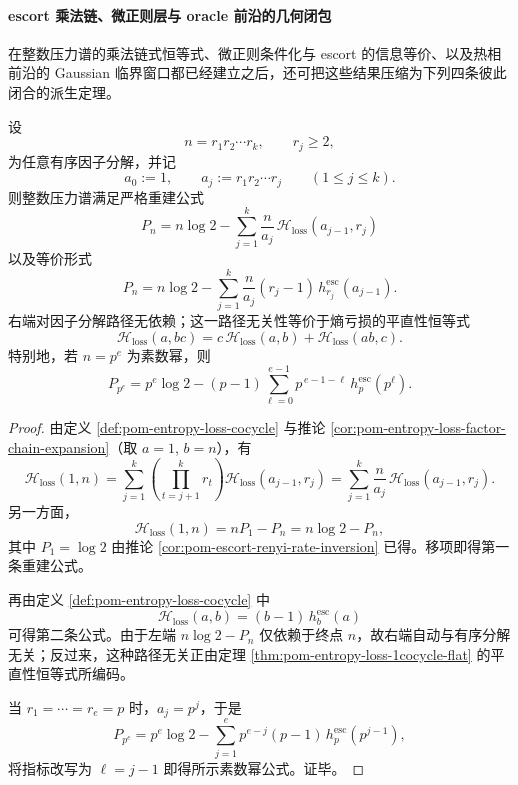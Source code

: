 \paragraph{escort 乘法链、微正则层与 oracle 前沿的几何闭包}
在整数压力谱的乘法链式恒等式、微正则条件化与 escort 的信息等价、以及热相前沿的 Gaussian 临界窗口都已经建立之后，还可把这些结果压缩为下列四条彼此闭合的派生定理。

\begin{theorem}[整数压力谱的素因子边缘全息重建]\label{thm:pom-pressure-prime-edge-holographic-reconstruction}
设
\[
n=r_1r_2\cdots r_k,\qquad r_j\ge 2,
\]
为任意有序因子分解，并记
\[
a_0:=1,\qquad a_j:=r_1r_2\cdots r_j\qquad(1\le j\le k).
\]
则整数压力谱满足严格重建公式
\[
\boxed{\;
P_n
=
n\log 2
-\sum_{j=1}^{k}\frac{n}{a_j}\,\mathcal{H}_{\mathrm{loss}}(a_{j-1},r_j)\;}
\]
以及等价形式
\[
\boxed{\;
P_n
=
n\log 2
-\sum_{j=1}^{k}\frac{n}{a_j}(r_j-1)\,h^{\mathrm{esc}}_{r_j}(a_{j-1}).\;}
\]
右端对因子分解路径无依赖；这一路径无关性等价于熵亏损的平直性恒等式
\[
\mathcal{H}_{\mathrm{loss}}(a,bc)
=
c\,\mathcal{H}_{\mathrm{loss}}(a,b)+\mathcal{H}_{\mathrm{loss}}(ab,c).
\]
特别地，若 \(n=p^e\) 为素数幂，则
\[
\boxed{\;
P_{p^e}
=
p^e\log 2
-(p-1)\sum_{\ell=0}^{e-1}p^{\,e-1-\ell}\,h^{\mathrm{esc}}_{p}(p^\ell).\;}
\]
\end{theorem}
\begin{proof}
由定义 \ref{def:pom-entropy-loss-cocycle} 与推论 \ref{cor:pom-entropy-loss-factor-chain-expansion}（取 \(a=1\), \(b=n\)），有
\[
\mathcal{H}_{\mathrm{loss}}(1,n)
=
\sum_{j=1}^{k}\left(\prod_{t=j+1}^{k}r_t\right)
\mathcal{H}_{\mathrm{loss}}(a_{j-1},r_j)
=
\sum_{j=1}^{k}\frac{n}{a_j}\,\mathcal{H}_{\mathrm{loss}}(a_{j-1},r_j).
\]
另一方面，
\[
\mathcal{H}_{\mathrm{loss}}(1,n)=nP_1-P_n=n\log 2-P_n,
\]
其中 \(P_1=\log 2\) 由推论 \ref{cor:pom-escort-renyi-rate-inversion} 已得。移项即得第一条重建公式。

再由定义 \ref{def:pom-entropy-loss-cocycle} 中
\[
\mathcal{H}_{\mathrm{loss}}(a,b)=(b-1)\,h^{\mathrm{esc}}_{b}(a)
\]
可得第二条公式。由于左端 \(n\log2-P_n\) 仅依赖于终点 \(n\)，故右端自动与有序分解无关；反过来，这种路径无关正由定理 \ref{thm:pom-entropy-loss-1cocycle-flat} 的平直性恒等式所编码。

当 \(r_1=\cdots=r_e=p\) 时，\(a_j=p^j\)，于是
\[
P_{p^e}
=
p^e\log 2-\sum_{j=1}^{e}p^{e-j}(p-1)\,h^{\mathrm{esc}}_{p}(p^{j-1}),
\]
将指标改写为 \(\ell=j-1\) 即得所示素数幂公式。证毕。
\end{proof}

